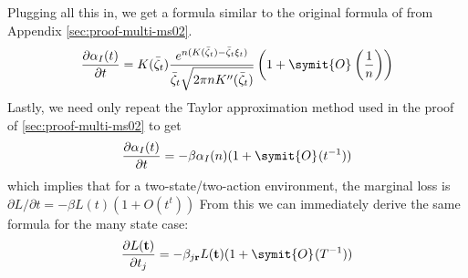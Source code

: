 \documentclass{fancyArticle}
\providecommand{\E}{\symcal{E}}             %
\renewcommand{\|}{\,|\,}                    %
\providecommand{\;}{\,;}                    %
\renewcommand{\O}{\symit{O}\:\!}            %
\begin{document}
\begin{appendix}
  Plugging all this in, we get a formula similar to the original formula of \cite{Lugannani1980} from Appendix \ref{sec:proof-multi-ms02}.
  \begin{align*}
   \frac{\partial \alpha_I(t)}{\partial t} = K(\bar{\zeta}_t) \frac{e^{n(K(\bar{\zeta}_t) - \bar{\zeta}_t \xi_t)}}
      {\bar{\zeta}_t \sqrt{2\pi n K''(\bar{\zeta}_t)}}
      \left(1+\O\left(\frac{1}{n}\right)\right)
  \end{align*}
  Lastly, we need only repeat the Taylor approximation method used in the proof of \autoref{sec:proof-multi-ms02} to get
  \begin{align*}
    \frac{\partial \alpha_I(t)}{\partial t} = -\beta \alpha_I(n)(1 + \O(t^{-1}))
  \end{align*}
  which implies that for a two-state/two-action environment, the marginal loss is $\partial L/\partial t = -\beta L(t)(1+O(t^t))$
  From this we can immediately derive the same formula for the many state case:
  \begin{align*}
    \frac{\partial L(\mathbf{t})}{\partial t_j} = -\beta_{j \mathbf{r}} L(\mathbf{t})
    (1 + \O(T^{-1}))
  \end{align*}

\end{appendix}
\end{document}
